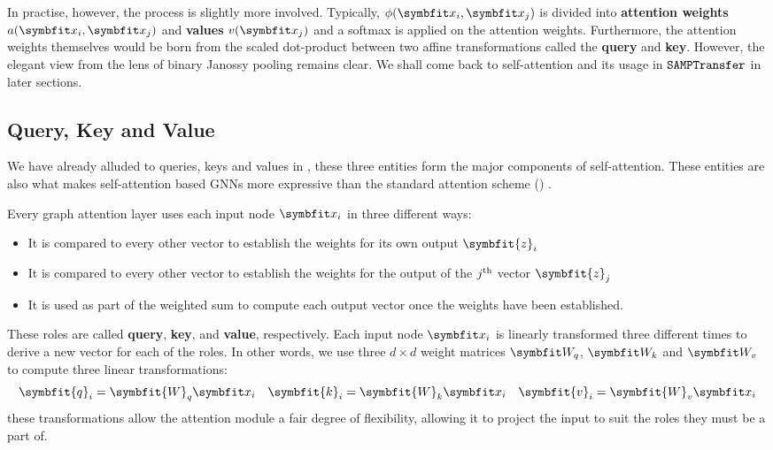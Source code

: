 In practise, however, the process is slightly more involved. Typically, $\phi(\bfitx_i, \bfitx_j)$ is divided into \textbf{attention weights} $a(\bfitx_i, \bfitx_j)$ and \textbf{values} $v(\bfitx_j)$ and a softmax is applied on the attention weights. Furthermore, the attention weights themselves would be born from the scaled dot-product between two affine transformations called the \textbf{query} and \textbf{key}.
However, the elegant view from the lens of binary Janossy pooling remains clear. We shall come back to self-attention and its usage in $\texttt{SAMPTransfer}$ in later sections.

\subsection{Query, Key and Value}\label{sec:attn-qkv}
We have already alluded to queries, keys and values in , these three entities form the major components of self-attention. These entities are also what makes self-attention based GNNs more expressive than the standard attention scheme () \parencite{brody2021attentive, Bronstein2021, Dwivedi2020}.

Every graph attention layer uses each input node $\bfitx_i$ in three different ways:
\begin{itemize}
    \item It is compared to every other vector to establish the weights for its own output $\symbfit{z}_i$
    \item It is compared to every other vector to establish the weights for the output of the $j\textsuperscript{th}$ vector $\symbfit{z}_j$
    \item It is used as part of the weighted sum to compute each output vector once the weights have been established.
\end{itemize}

These roles are called \textbf{query}, \textbf{key}, and \textbf{value}, respectively. Each input node $\bfitx_i$ is linearly transformed three different times to derive a new vector for each of the roles. In other words, we use three $d\times d$ weight matrices $\Wq$, $\Wk$ and $\Wv$ to compute three linear transformations:
\begin{equation}
    \symbfit{q}_{i}=\symbfit{W}_{q} \bfitx_{i} \quad \symbfit{k}_{i}=\symbfit{W}_{k} \bfitx_{i} \quad \symbfit{v}_{i}=\symbfit{W}_{v} \bfitx_{i}
\end{equation}
these transformations allow the attention module a fair degree of flexibility, allowing it to project the input to suit the roles they must be a part of. 

